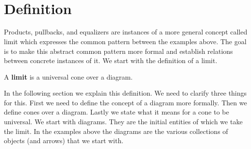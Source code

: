 \\[1em]
\begin{minipage}{.35\linewidth}
\end{minipage}%
\begin{minipage}{.35\linewidth}
\end{minipage}%
\begin{minipage}{.3\linewidth}
\end{minipage}\\[2em]

\section{Definition}
Products, pullbacks, and equalizers are instances of a more general concept called
limit which expresses the common pattern between the examples above.
The goal is to make this abstract common pattern more formal
and establish relations between concrete instances of it.
We start with the definition of a limit.
\begin{definition}
  A \textbf{limit} is a universal cone over a diagram.
\end{definition}

In the following section we explain this definition. We need to clarify three things for this.
First we need to define the concept of a diagram more formally.
Then we define cones over a diagram. Lastly we state what it means for a cone
to be universal.
We start with diagrams. They are the initial entities of which we take the limit.
In the examples above the diagrams
are the various collections of objects (and arrows) that we start with.

